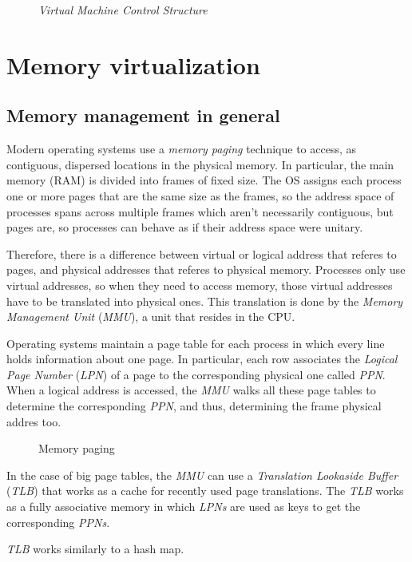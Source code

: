 \begin{figure}[h!]
    \centering
    \caption{\emph{Virtual Machine Control Structure}}
\end{figure}

\section{Memory virtualization}
\subsection{Memory management in general}
Modern operating systems use a \emph{memory paging} technique to access, as
contiguous, dispersed locations in the physical memory. In particular, the main
memory (RAM) is divided into frames of fixed size. The OS assigns each process
one or more pages that are the same size as the frames, so the address space of
processes spans across multiple frames which aren't necessarily contiguous, but
pages are, so processes can behave as if their address space were unitary.

Therefore, there is a difference between virtual or logical address that referes
to pages, and physical addresses that referes to physical memory. Processes
only use virtual addresses, so when they need to access memory, those virtual
addresses have to be translated into physical ones. This translation is done by the
\emph{Memory Management Unit} (\emph{MMU}), a unit that resides in the CPU.

Operating systems maintain a page table for each process in which every line
holds information about one page. In particular, each row associates the
\emph{Logical Page Number} (\emph{LPN}) of a page to the corresponding physical
one called \emph{PPN}. When a logical address is accessed, the \emph{MMU} walks
all these page tables to determine the corresponding \emph{PPN}, and thus,
determining the frame physical addres too.

\begin{figure}[h!]
    \centering
    \caption{Memory paging}
\end{figure}

\noindent
In the case of big page tables, the \emph{MMU} can use a \emph{Translation
Lookaside Buffer} (\emph{TLB}) that works as a cache for recently used page
translations. The \emph{TLB} works as a fully associative memory in which
\emph{LPNs} are used as keys to get the corresponding \emph{PPNs}.
\begin{note}
    \emph{TLB} works similarly to a hash map.
\end{note}

